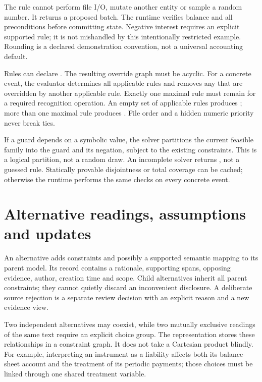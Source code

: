 The rule cannot perform file I/O, mutate another entity or sample a random
number. It returns a proposed batch. The runtime verifies balance and all
preconditions before committing state. Negative interest requires an explicit
supported rule; it is not mishandled by this intentionally restricted example.
Rounding is a declared demonstration convention, not a universal accounting
default.

Rules can declare . The resulting override graph
must be acyclic. For a concrete event, the evaluator determines all applicable
rules and removes any that are overridden by another applicable rule. Exactly
one maximal rule must remain for a required recognition operation. An empty
set of applicable rules produces ; more than one
maximal rule produces
. File order and a hidden numeric priority never break ties.

If a guard depends on a symbolic value, the solver partitions the current
feasible family into the guard and its negation, subject to the existing
constraints. This is a logical partition, not a random draw. An incomplete
solver returns , not a guessed rule. Statically
provable disjointness or total coverage can be cached; otherwise the runtime
performs the same checks on every concrete event.

\section{Alternative readings, assumptions and updates}

An alternative adds constraints and possibly a supported semantic mapping to
its parent model. Its record contains a rationale, supporting spans, opposing
evidence, author, creation time and scope. Child alternatives inherit all
parent constraints; they cannot quietly discard an inconvenient disclosure.
A deliberate source rejection is a separate review decision with an explicit
reason and a new evidence view.

Two independent alternatives may coexist, while two mutually exclusive readings
of the same text require an explicit choice group. The representation stores
these relationships in a constraint graph. It does not take a Cartesian
product blindly. For example, interpreting an instrument as a liability affects
both its balance-sheet account and the treatment of its periodic payments;
those choices must be linked through one shared treatment variable.

